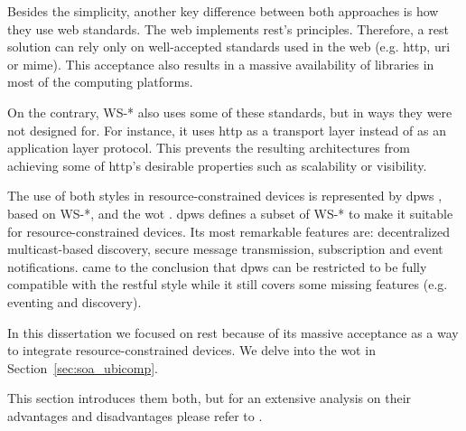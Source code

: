 

Besides the simplicity, another key difference between both approaches is how they use web standards. %
The web implements \ac{rest}'s principles.
Therefore, a \ac{rest} solution can rely only on well-accepted standards used in the web (e.g. \acs{http}, \acs{uri} or \acs{mime}).
This acceptance also results in a massive availability of libraries in most of the computing platforms.


On the contrary, WS-* also uses some of these standards, but in ways they were not designed for.
For instance, it uses \ac{http} as a transport layer instead of as an application layer protocol.
This prevents the resulting architectures from achieving some of \ac{http}'s desirable properties such as scalability or visibility.


\bigskip


The use of both styles in resource-constrained devices is represented by
\ac{dpws} \citep{moritz_devices_2010}, based on WS-*, and the \ac{wot} \citep{guinard_internet_2011}. %
\ac{dpws} defines a subset of WS-* to make it suitable for resource-constrained devices.
Its most remarkable features are: decentralized multicast-based discovery, secure message transmission, subscription and event notifications.
\citeauthor{moritz_devices_2010} came to the conclusion that \ac{dpws} can be restricted to be fully compatible with the \ac{rest}ful style while it still covers some missing features (e.g. eventing and discovery).


In this dissertation we focused on \ac{rest} because of its massive acceptance as a way to integrate resource-constrained devices. %
We delve into the \ac{wot} in Section~\ref{sec:soa_ubicomp}. %




This section introduces them both, but for an extensive analysis on their advantages and disadvantages please refer to \citet{pautasso_restful_2008}.



